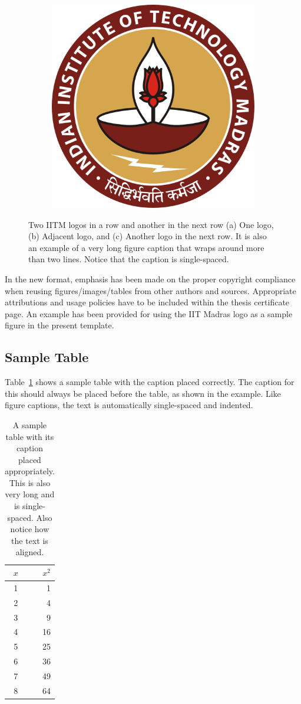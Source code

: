 \begin{figure}[htpb]
	\begin{subfigure}{1\textwidth}
		\centering
		\includegraphics[width=0.45\linewidth]{iitmlogo.eps}
		\caption{}
		\label{fig:iitmc}
\end{subfigure}
    \caption {Two IITM logos in a row and another in the next row (a) One logo, (b) Adjacent logo, and (c) Another logo in the next row. It is also an example of a very long figure caption that wraps around more than two lines. Notice that the caption is single-spaced.}
\label{fig:iitm}
\end{figure}

In the new format, emphasis has been made on the proper copyright compliance when reusing figures/images/tables from other authors and sources. Appropriate attributions and usage policies have to be included within the thesis certificate page. An example has been provided for using the IIT Madras logo as a sample figure in the present template.

\subsection{Sample Table}

Table~\ref{tab:sample} shows a sample table with the caption placed correctly. The caption for this should always be placed before the table, as shown in the example. Like figure captions, the text is automatically single-spaced and indented.

\begin{table}[htbp]
  \caption{A sample table with its caption placed appropriately. This is also very long and is single-spaced. Also notice how the text is aligned.}
  \begin{center}
  \begin{tabular}[c]{|c|r|} \hline
    $x$ & $x^2$ \\ \hline
    1  &  1   \\
    2  &  4  \\
    3  &  9  \\
    4  &  16  \\
    5  &  25  \\
    6  &  36  \\
    7  &  49  \\
    8  &  64  \\ \hline
  \end{tabular}
  \label{tab:sample}
  \end{center}
\end{table}


